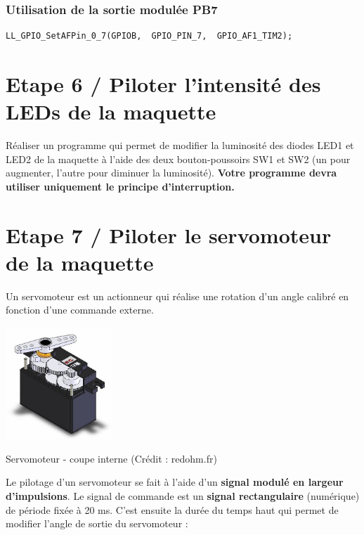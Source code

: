 \documentclass[a4paper,11pt,titlepage]{article} %
\begin{document}
\subsubsection{Utilisation de la sortie modulée PB7}
	
\begin{lstlisting}
LL_GPIO_SetAFPin_0_7(GPIOB,  GPIO_PIN_7,  GPIO_AF1_TIM2);
\end{lstlisting}



\section{Etape 6 / Piloter l'intensité des LEDs de la maquette}

\Manip Réaliser un programme qui permet de modifier la luminosité des diodes LED1 et LED2 de la maquette à l'aide des deux bouton-poussoirs SW1 et SW2 (un pour augmenter, l'autre pour diminuer la luminosité). \textbf{Votre programme devra utiliser uniquement le principe d'interruption.}

\newpage
\section{Etape 7 / Piloter le servomoteur de la maquette}

Un servomoteur est un actionneur qui réalise une rotation d'un angle calibré en fonction d'une commande externe.

\begin{center}
	\includegraphics[width=0.3\textwidth]{images/MINE_Nucleo_servomoteur-redohm.jpg}
	
	Servomoteur - coupe interne (Crédit : redohm.fr)
\end{center}

Le pilotage d'un servomoteur se fait à l'aide d'un \textbf{signal modulé en largeur d'impulsions}. Le signal de commande est un \textbf{signal rectangulaire} (numérique) de période fixée à 20 ms. C'est ensuite la durée du temps haut qui permet de modifier l'angle de sortie du servomoteur :
\end{document}
